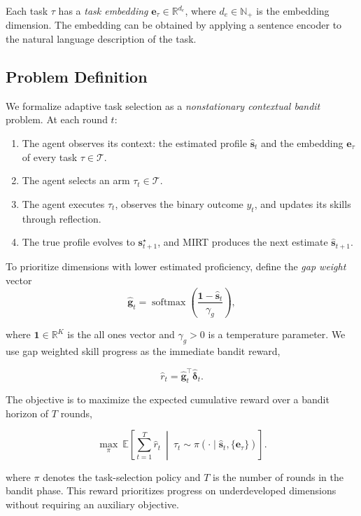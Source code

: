 \documentclass{article} %
\begin{document}
Each task \(\tau\) has a \emph{task embedding} \(\mathbf{e}_\tau\in\mathbb{R}^{d_e}\), where \(d_e\in\mathbb{N}_{+}\) is the embedding dimension. The embedding can be obtained by applying a sentence encoder to the natural language description of the task.

\subsection{Problem Definition}

We formalize adaptive task selection as a \emph{nonstationary contextual bandit} problem. At each round \(t\):

\begin{enumerate}
    \item The agent observes its context: the estimated profile \(\widehat{\mathbf{s}}_t\) and the embedding \(\mathbf{e}_\tau\) of every task \(\tau \in \mathcal{T}\).
    \item The agent selects an arm \(\tau_t \in \mathcal{T}\).
    \item The agent executes \(\tau_t\), observes the binary outcome \(y_t\), and updates its skills through reflection.
    \item The true profile evolves to \(\mathbf{s}_{t+1}^\star\), and MIRT produces the next estimate \(\widehat{\mathbf{s}}_{t+1}\).
\end{enumerate}

To prioritize dimensions with lower estimated proficiency, define the \emph{gap weight} vector
\[
    \widehat{\mathbf{g}}_t = \operatorname{softmax}\!\left( \frac{\mathbf{1} - \widehat{\mathbf{s}}_t}{\gamma_g} \right),
\]

where \(\mathbf{1}\in\mathbb{R}^K\) is the all ones vector and \(\gamma_g>0\) is a temperature parameter. We use gap weighted skill progress as the immediate bandit reward,

\[
    \widehat r_t = \widehat{\mathbf{g}}_t^\top\widehat{\boldsymbol{\delta}}_t.
\]

The objective is to maximize the expected cumulative reward over a bandit horizon of \(T\) rounds,

\[
    \max_{\pi}\ \mathbb{E}\left[\sum_{t=1}^{T} \widehat r_t\ \middle|\ \tau_t\sim\pi(\cdot\mid\widehat{\mathbf{s}}_t,\{\mathbf{e}_\tau\})\right].
\]

where \(\pi\) denotes the task-selection policy and \(T\) is the number of rounds in the bandit phase. This reward prioritizes progress on underdeveloped dimensions without requiring an auxiliary objective.
\end{document}
